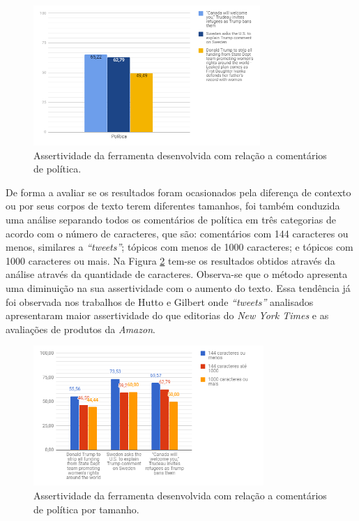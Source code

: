 \begin{figure}[!htbp]
\centering
\includegraphics[height=200px]{imagens/politica1.png}
\caption{Assertividade da ferramenta desenvolvida com relação a comentários de
política.}
\label{fig:pol1}
\end{figure}

De forma a
avaliar se os resultados foram ocasionados pela diferença de contexto ou por
seus corpos de texto terem diferentes tamanhos, foi também conduzida uma análise
separando todos os comentários de política em três categorias de acordo com o
número de caracteres, que são: comentários com 144 caracteres ou menos,
similares a \textit{``tweets''}; tópicos com menos de 1000 caracteres; e tópicos
com 1000 caracteres ou mais. Na Figura \ref{fig:pol2} tem-se os resultados obtidos através da análise através da quantidade de caracteres.
Observa-se que o método apresenta uma diminuição na sua assertividade com o
aumento do texto. Essa tendência já foi observada nos
trabalhos de Hutto e Gilbert \cite{conf/icwsm/HuttoG14} onde \textit{``tweets''}
analisados apresentaram maior assertividade do que editorias do \textit{New
York Times} e as avaliações de produtos da \textit{Amazon}.


\begin{figure}[!htbp]
\centering
\includegraphics[height=200px]{imagens/politica2.png}
\caption{Assertividade da ferramenta desenvolvida com relação a comentários de
política por tamanho.}
\label{fig:pol2}
\end{figure}




